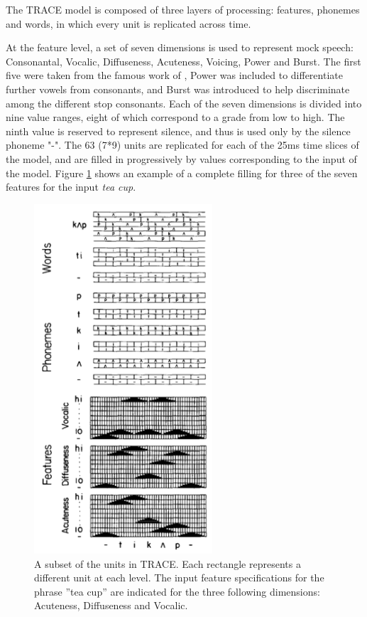 The TRACE model is composed of three layers of processing: features, phonemes and words, in which every unit is replicated across time.
 
At the feature level, a set of seven dimensions is used to represent mock speech: Consonantal, Vocalic, Diffuseness, Acuteness, Voicing, Power and Burst. The first five were taken from the famous work of \citep{jakobson1961preliminaries}, Power was included to differentiate further vowels from consonants, and Burst was introduced to help discriminate among the different stop consonants. 
Each of the seven dimensions is divided into nine value ranges, eight of which correspond to a grade from low to high. The ninth value is reserved to represent silence, and thus is used only by the silence phoneme "-". The 63 (7*9) units are replicated for each of the 25ms time slices of the model, and are filled in progressively by values corresponding to the input of the model. Figure \ref{TRACEarch} shows an example of a complete filling for three of the seven features for the input \textit{tea cup}.

\begin{figure}
\includegraphics[height=13cm]{images/TRACE_architecture.png}
\caption{A subset of the units in TRACE. Each rectangle represents a different unit at each level. The input feature specifications for the phrase ”tea cup” are indicated for the three following dimensions: Acuteness, Diffuseness and Vocalic. \citep{mcclelland1986trace}}
\label{TRACEarch}
\end{figure}


